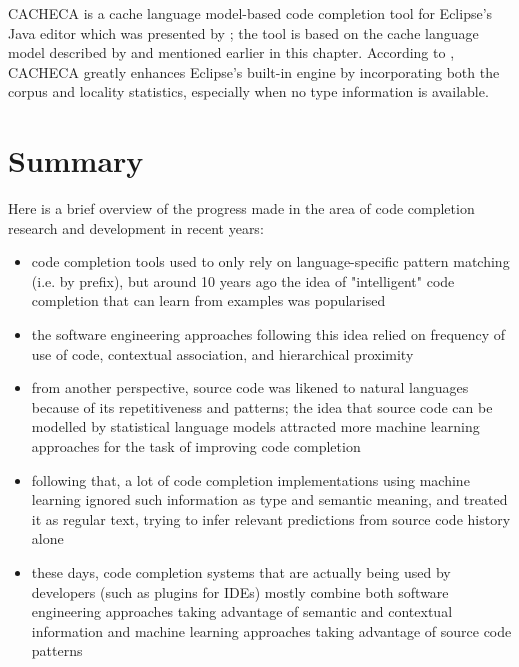 CACHECA is a cache language model-based code completion tool for Eclipse's Java editor which was presented by \cite{Fran15a}; the tool is based on the cache language model described by \cite{Tu14a} and mentioned earlier in this chapter. According to \cite{Fran15a}, CACHECA greatly enhances Eclipse's built-in engine by incorporating both the corpus and locality statistics, especially when no type information is available.

\section{Summary}
\label{sec:RelatedWorks-Summary}
Here is a brief overview of the progress made in the area of code completion research and development in recent years:
\begin{itemize}
    \item code completion tools used to only rely on language-specific pattern matching (i.e. by prefix), but around 10 years ago the idea of "intelligent" code completion that can learn from examples was popularised
    \item the software engineering approaches following this idea relied on frequency of use of code, contextual association, and hierarchical proximity
    \item from another perspective, source code was likened to natural languages because of its repetitiveness and patterns; the idea that source code can be modelled by statistical language models attracted more machine learning approaches for the task of improving code completion
    \item following that, a lot of code completion implementations using machine learning ignored such information as type and semantic meaning, and treated it as regular text, trying to infer relevant predictions from source code history alone
    \item these days, code completion systems that are actually being used by developers (such as plugins for IDEs) mostly combine both software engineering approaches taking advantage of semantic and contextual information and machine learning approaches taking advantage of source code patterns
\end{itemize}
